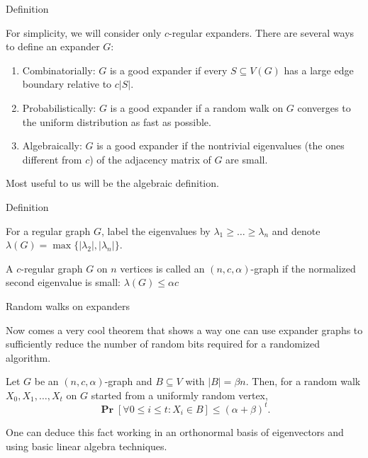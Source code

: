 \documentclass[10pt]{beamer}
\renewcommand{\P}{\operatorname*{\mathbf{Pr}}}
\renewcommand{\l}{\left}
\renewcommand{\r}{\right}
\renewcommand{\a}{\alpha}
\renewcommand{\b}{\beta}
\begin{document}
\begin{frame}{Definition}

  For simplicity, we will consider only $c$-regular expanders. There
  are several ways to define an expander $G$:
  \begin{enumerate}
  \item Combinatorially: $G$ is a good expander if every $S\subseteq
    V(G)$ has a large edge boundary relative to $c|S|$.
    \pause\bigskip\bigskip
  \item Probabilistically: $G$ is a good expander if a random walk on
    $G$ converges to the uniform distribution as fast as possible.
  \pause\bigskip\bigskip
  \item Algebraically: $G$ is a good expander if the nontrivial
    eigenvalues (the ones different from $c$) of the adjacency matrix
    of $G$ are small.
\end{enumerate}

\pause\bigskip\bigskip

Most useful to us will be the algebraic definition.

\end{frame}

\begin{frame}{Definition}
  \begin{definition}
    For a regular graph $G$, label the eigenvalues by
    $\lambda_1\geq\ldots\geq\lambda_n$ and denote
    $\lambda(G)=\max\{|\lambda_2|,|\lambda_n|\}$.
  \end{definition}

  \pause\bigskip\bigskip

  \begin{definition}
    A $c$-regular graph $G$ on $n$ vertices is called an
    $(n,c,\a)$-graph if the normalized second eigenvalue is small:
    $\lambda(G)\leq \a c$
  \end{definition}

\end{frame}

\begin{frame}[allowframebreaks]{Random walks on expanders}

  Now comes a very cool theorem that shows a way one can use expander
  graphs to sufficiently reduce the number of random bits required for
  a randomized algorithm.

  \pause\bigskip

  \begin{theorem}
    Let $G$ be an $(n,c,\a)$-graph
    and $B\subseteq V$ with $|B|=\b n$. Then, for a random walk
    $X_0,X_1,\ldots,X_t$ on $G$ started from a uniformly random
    vertex,
    \[
    \P\l[\forall 0\leq i\leq t: X_i\in B\r]\leq (\a+\b)^t.
    \]
  \end{theorem}

  \pause\bigskip

  One can deduce this fact working in an orthonormal basis of
  eigenvectors and using basic linear algebra techniques.
\end{frame}
\end{document}
